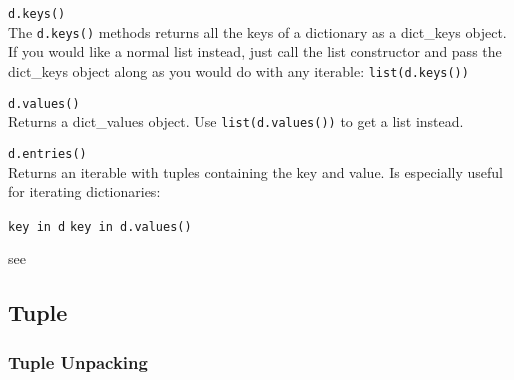 \begin{itemize}
             \texttt{d.keys()} \\
            The \texttt{d.keys()} methods returns all the keys of a dictionary as a
            dict\_keys
            object. If you would like a normal list instead, just call the list constructor and pass
            the dict\_keys object along as you would do with any iterable:
            \texttt{list(d.keys())}

             \texttt{d.values()} \\
            Returns a dict\_values object. Use \texttt{list(d.values())} to get a list
            instead.

             \texttt{d.entries()} \\
            Returns an iterable with tuples containing the key and value.
            Is especially useful for iterating dictionaries:


            \begin{itemize}
                 \texttt{key in d}
                 \texttt{key in d.values()}
            \end{itemize}

             see 

        \end{itemize}


    \subsection{Tuple}

        \subsubsection{Tuple Unpacking}
